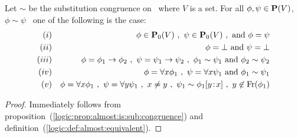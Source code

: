 \begin{theorem}\label{logic:the:sub:congruence:charac}
Let $\sim$ be the substitution congruence on \pv\ where $V$ is a
set. For all $\phi,\psi\in\mbox{${\bf P}(V)$}$, $\phi\sim\psi$ \ifand\ one of the
following is the case:
    \begin{eqnarray*}
    (i)&&\phi\in\pvo\ ,\ \psi\in\pvo\ ,\ \mbox{and}\ \phi=\psi\\
    (ii)&&\phi=\bot\ \mbox{and}\ \psi=\bot\\
    (iii)&&\phi=\phi_{1}\to\phi_{2}\ ,\ \psi=\psi_{1}\to\psi_{2}\ ,\
    \phi_{1}\sim\psi_{1}\ \mbox{and}\ \phi_{2}\sim\psi_{2}\\
    (iv)&&\phi=\forall x\phi_{1}\ ,\ \psi=\forall x\psi_{1}\ \mbox{and}\ \phi_{1}\sim\psi_{1}\\
    (v)&&\phi=\forall x\phi_{1}\ ,\ \psi=\forall y\psi_{1}\ ,\ x\neq y\ ,\
    \psi_{1}\sim \phi_{1}[y\!:\!x]\ ,\ y\not\in\free(\phi_{1})
    \end{eqnarray*}
\end{theorem}
\begin{proof}
Immediately follows from
proposition~(\ref{logic:prop:almost:is:sub:congruence}) and
definition~(\ref{logic:def:almost:equivalent}).
\end{proof}
